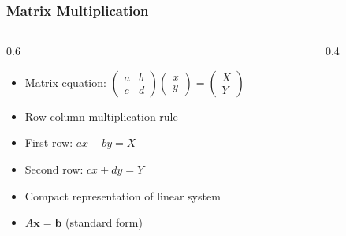 \begin{frame}[fragile]\frametitle{Matrix Multiplication}
  \begin{columns}
    \begin{column}[T]{0.6\linewidth}
      \begin{itemize}
        \item Matrix equation: $\begin{pmatrix} a & b \\ c & d \end{pmatrix} \begin{pmatrix} x \\ y \end{pmatrix} = \begin{pmatrix} X \\ Y \end{pmatrix}$
        \item Row-column multiplication rule
        \item First row: $ax + by = X$
        \item Second row: $cx + dy = Y$
        \item Compact representation of linear system
        \item $A\mathbf{x} = \mathbf{b}$ (standard form)
      \end{itemize}
    \end{column}
    \begin{column}[T]{0.4\linewidth}
      \begin{center}
      \end{center}
    \end{column}
  \end{columns}
\end{frame}

